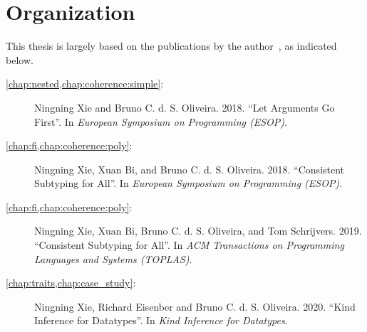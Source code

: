 \section{Organization}

This thesis is largely based on the
publications by the author~\citep{esop2018:arguments,esop2018:consistent,toplas:consistent,popl:kind},
as indicated below.
\begin{description}
\item[\cref{chap:nested,chap:coherence:simple}:] Ningning Xie and Bruno C. d. S.
  Oliveira. 2018. ``Let Arguments Go First''. In
  \emph{European Symposium on Programming (ESOP)}.
\item[\cref{chap:fi,chap:coherence:poly}:] Ningning Xie, Xuan Bi, and Bruno C. d. S.
  Oliveira. 2018. ``Consistent Subtyping for All''. In
  \emph{European Symposium on Programming (ESOP)}.
\item[\cref{chap:fi,chap:coherence:poly}:] Ningning Xie, Xuan Bi, Bruno C. d. S.
  Oliveira, and Tom Schrijvers. 2019. ``Consistent Subtyping for All''. In
  \emph{ACM Transactions on Programming Languages and Systems (TOPLAS)}.
\item[\cref{chap:traits,chap:case_study}:] Ningning Xie, Richard Eisenber and Bruno C. d. S. Oliveira.
  2020. ``Kind Inference for Datatypes''. In \emph{Kind Inference for Datatypes}.
\end{description}


\noindent\makebox[\linewidth]{\rule{0.7\textwidth}{0.4pt}}

\vspace{1.5\baselineskip}



